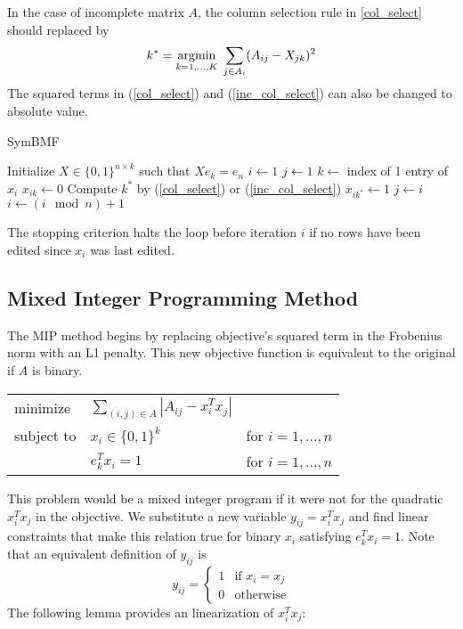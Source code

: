 In the case of incomplete matrix $A$, the column selection rule in
\ref{col_select} should replaced by
\begin{equation} \label{inc_col_select}
k^* = \underset{k = 1,...,K}{\mathrm{arg min}}\; \sum_{j \in A_i} (A_{ij} - X_{jk})^2
\end{equation}
The squared terms in (\ref{col_select}) and (\ref{inc_col_select}) can
also be changed to absolute value.

\begin{algorithm}
\caption{SymBMF}
\begin{algorithmic}[1]
\State Initialize $X \in \{0, 1\}^{n \times k}$ such that $X e_k = e_n$
\State $i \gets 1$
\State $j \gets 1$
\Repeat
  \State $k \gets$ index of 1 entry of $x_i$
  \State $x_{ik} \gets 0$
  \State Compute $k^*$ by (\ref{col_select}) or (\ref{inc_col_select})
  \State $x_{ik^*} \gets 1$
   
    \State $j \gets i$
  \EndIf
  \State $i \gets (i \mod n) + 1$
\end{algorithmic}
\end{algorithm}

The stopping criterion halts the loop before iteration $i$ if no rows
have been edited since $x_i$ was last edited.



\subsection{Mixed Integer Programming Method}

The MIP method begins by replacing objective's squared term in the
Frobenius norm with an L1 penalty. This new objective function is
equivalent to the original if $A$ is binary.
\begin{center}
\begin{tabular}{l l l}
minimize   & $\sum_{(i,j) \in A} |A_{ij} - x_i^T x_j|$ \\
subject to & $x_i \in \{0, 1\}^k$ & for $i = 1, ..., n$ \\
           & $e_k^T x_i = 1$ & for $i = 1, ..., n$
\end{tabular}
\end{center}
This problem would be a mixed integer program if it were not for the
quadratic $x_i^T x_j$ in the objective. We substitute a new variable
$y_{ij} = x_i^T x_j$ and find linear constraints that make this
relation true for binary $x_i$ satisfying $e_k^T x_i = 1$.
Note that an equivalent definition of
$y_{ij}$ is
\[ y_{ij} = \begin{cases}
  1 & \text{if } x_i = x_j \\
  0 & \text{otherwise}
\end{cases}\]
The following lemma provides an linearization of $x_i^T x_j$:

